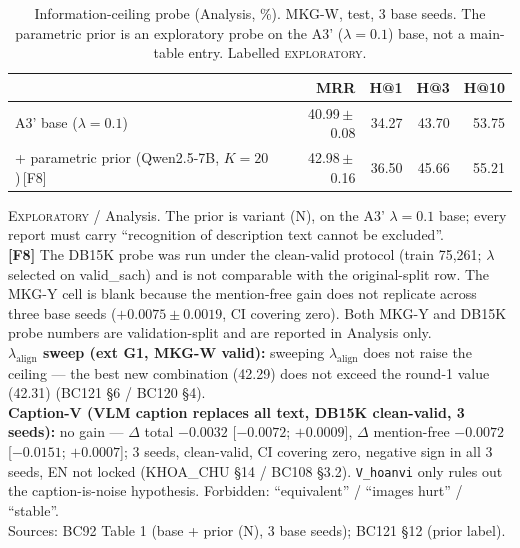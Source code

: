\begin{table}[t]
\centering
\footnotesize
\setlength{\tabcolsep}{4pt}
\caption{Information-ceiling probe (Analysis, \%). MKG-W, test, 3 base seeds. The parametric prior is an exploratory probe on the A3' ($\lambda{=}0.1$) base, not a main-table entry. Labelled \textsc{exploratory}.}
\label{tab:ceiling}
\begin{tabular}{l r r r r}
\toprule
 & MRR & H@1 & H@3 & H@10 \\
\midrule
A3' base ($\lambda{=}0.1$) & 40.99\,$\pm$\,0.08 & 34.27 & 43.70 & 53.75 \\
\;+ parametric prior (Qwen2.5-7B, $K{=}20$)\,[F8] & 42.98\,$\pm$\,0.16 & 36.50 & 45.66 & 55.21 \\
\bottomrule
\end{tabular}

\vspace{2pt}
\begin{minipage}{\linewidth}\footnotesize\raggedright
\textsc{Exploratory} / Analysis. The prior is variant (N), on the A3' $\lambda{=}0.1$ base; every report must carry ``recognition of description text cannot be excluded''. \\
\textbf{[F8]} The DB15K probe was run under the clean-valid protocol (train 75,261; $\lambda$ selected on valid\_sach) and is not comparable with the original-split row. The MKG-Y cell is blank because the mention-free gain does not replicate across three base seeds ($+0.0075 \pm 0.0019$, CI covering zero). Both MKG-Y and DB15K probe numbers are validation-split and are reported in Analysis only. \\
\textbf{$\lambda_{\text{align}}$ sweep (ext G1, MKG-W valid):} sweeping $\lambda_{\text{align}}$ does not raise the ceiling --- the best new combination (42.29) does not exceed the round-1 value (42.31) (BC121 §6 / BC120 §4). \\
\textbf{Caption-V (VLM caption replaces all text, DB15K clean-valid, 3 seeds):} no gain --- $\Delta$ total $-0.0032$ [$-0.0072$; $+0.0009$], $\Delta$ mention-free $-0.0072$ [$-0.0151$; $+0.0007$]; 3 seeds, clean-valid, CI covering zero, negative sign in all 3 seeds, EN not locked (KHOA\_CHU §14 / BC108 §3.2). \texttt{V\_hoanvi} only rules out the caption-is-noise hypothesis. Forbidden: ``equivalent'' / ``images hurt'' / ``stable''. \\
Sources: BC92 Table 1 (base + prior (N), 3 base seeds); BC121 §12 (prior label). \\
\end{minipage}
\end{table}
